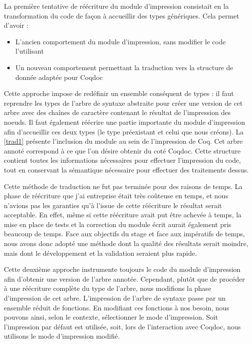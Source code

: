 \documentclass[a4paper, 11pt]{report}
\begin{document}
    La première tentative de réécriture du module d'impression consistait
    en la transformation du code de façon à accueillir des types génériques.
    Cela permet d'avoir :
    \begin{itemize}
      \item L'ancien comportement du module d'impression, sans modifier le code
        l'utilisant
      \item Un nouveau comportement permettant la traduction vers la
        structure de donnée adaptée pour Coqdoc
    \end{itemize}

    Cette approche impose de redéfinir un ensemble conséquent de types :
    il faut reprendre les types de l'arbre de syntaxe abstraite pour créer
    une version de cet arbre avec des chaînes de caractère contenant le
    résultat de l'impression des noeuds. Il faut également réécrire une partie
    importante du module d'impression afin d'accueillir ces deux types (le type
    préexistant et celui que nous créons). La \cref{trad1} présente
    l'inclusion du module au sein de l'impression de Coq. Cet arbre annoté
    correspond à ce que l'on désire obtenir du coté Coqdoc. Cette structure
    contient toutes les informations nécessaires pour effectuer l'impression
    du code, tout en conservant la sémantique nécessaire pour effectuer des
    traitements dessus.

    Cette méthode de traduction ne fut pas terminée pour des raisons de temps.
    La phase de réécriture que j'ai entreprise était très coûteuse en temps,
    et nous n'avions pas les garanties qu'à l'issue de cette réécriture le
    résultat serait acceptable. En effet, même si cette réécriture avait put
    être achevée à temps, la mise en place de tests et la correction du module
    écrit aurait également pris beaucoup de temps. Face aux objectifs du stage
    et face aux impératifs de temps, nous avons donc adopté une méthode dont
    la qualité des résultats serait moindre, mais dont le développement et la
    validation seraient plus rapide.

    Cette deuxième approche instrumente toujours le code du module d'impression
    afin d'obtenir une version de l'arbre annotée. Cependant, plutôt que de
    procéder à une réécriture complète du type de l'arbre, nous modifions la
    phase d'impression de cet arbre. L'impression de l'arbre de syntaxe passe
    par un ensemble réduit de fonctions. En modifiant ces fonctions à nos
    besoin, nous pouvons ainsi, selon le contexte, sélectionner le mode
    d'impression. Soit l'impression par défaut est utilisée, soit, lors de
    l'interaction avec Coqdoc, nous utilisons le mode d'impression modifié.
\end{document}
